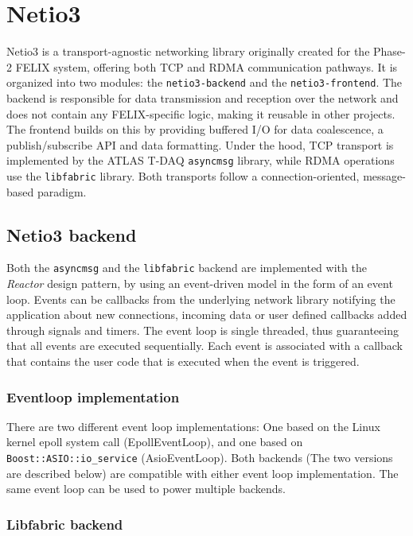 \chapter{Netio3}
\label{chap:netio3}

Netio3 \cite{netio3-docs} is a transport-agnostic networking library originally created for the Phase-2 \acs{FELIX} system, offering both TCP and \acs{RDMA} communication pathways.  It is organized into two modules: the \texttt{netio3-backend} and the \texttt{netio3-frontend}.  The backend is responsible for data transmission and reception over the network and does not contain any \acs{FELIX}-specific logic, making it reusable in other projects. The frontend builds on this by providing buffered I/O for data coalescence, a publish/subscribe API and data formatting.  Under the hood, TCP transport is implemented by the \acs{ATLAS} \acs{T-DAQ} \texttt{asyncmsg} \cite{asyncmsg} library, while \acs{RDMA} operations use the \texttt{libfabric} \cite{libfabric} library.  Both transports follow a connection-oriented, message-based paradigm.

\section{Netio3 backend}

Both the \texttt{asyncmsg} and the \texttt{libfabric} backend are implemented with the \emph{Reactor} design pattern, by using an event-driven model in the form of an event loop. Events can be callbacks from the underlying network library notifying the application about new connections, incoming data or user defined callbacks added through signals and timers. The event loop is single threaded, thus guaranteeing that all events are executed sequentially. Each event is associated with a callback that contains the user code that is executed when the event is triggered.

\subsection{Eventloop implementation}

There are two different event loop implementations: One based on the Linux kernel epoll system call (EpollEventLoop), and one based on \texttt{Boost::ASIO::io\_service} (AsioEventLoop). Both backends (The two versions are described below) are compatible with either event loop implementation. The same event loop can be used to power multiple backends.


\subsection{Libfabric backend}
\label{subsec:libfabric}

